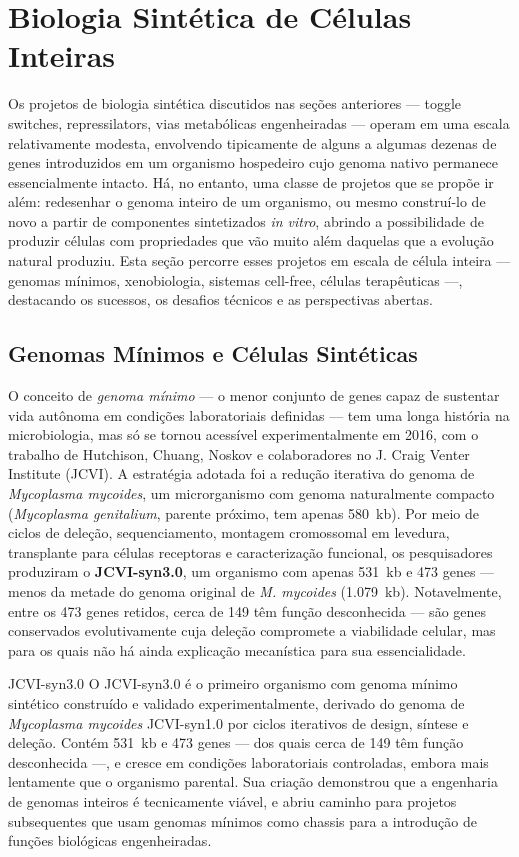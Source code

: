 \section{Biologia Sintética de Células Inteiras}
\label{sec:14-celulas}

Os projetos de biologia sintética discutidos nas seções anteriores --- toggle switches, repressilators, vias metabólicas engenheiradas --- operam em uma escala relativamente modesta, envolvendo tipicamente de alguns a algumas dezenas de genes introduzidos em um organismo hospedeiro cujo genoma nativo permanece essencialmente intacto. Há, no entanto, uma classe de projetos que se propõe ir além: redesenhar o genoma inteiro de um organismo, ou mesmo construí-lo de novo a partir de componentes sintetizados \emph{in vitro}, abrindo a possibilidade de produzir células com propriedades que vão muito além daquelas que a evolução natural produziu. Esta seção percorre esses projetos em escala de célula inteira --- genomas mínimos, xenobiologia, sistemas cell-free, células terapêuticas ---, destacando os sucessos, os desafios técnicos e as perspectivas abertas.

\subsection{Genomas Mínimos e Células Sintéticas}

O conceito de \emph{genoma mínimo} --- o menor conjunto de genes capaz de sustentar vida autônoma em condições laboratoriais definidas --- tem uma longa história na microbiologia, mas só se tornou acessível experimentalmente em 2016, com o trabalho de Hutchison, Chuang, Noskov e colaboradores no J. Craig Venter Institute (JCVI). A estratégia adotada foi a redução iterativa do genoma de \textit{Mycoplasma mycoides}, um microrganismo com genoma naturalmente compacto (\textit{Mycoplasma genitalium}, parente próximo, tem apenas 580~kb). Por meio de ciclos de deleção, sequenciamento, montagem cromossomal em levedura, transplante para células receptoras e caracterização funcional, os pesquisadores produziram o \textbf{JCVI-syn3.0}, um organismo com apenas 531~kb e 473 genes --- menos da metade do genoma original de \textit{M. mycoides} (1.079~kb). Notavelmente, entre os 473 genes retidos, cerca de 149 têm função desconhecida --- são genes conservados evolutivamente cuja deleção compromete a viabilidade celular, mas para os quais não há ainda explicação mecanística para sua essencialidade.

\begin{definicao}{JCVI-syn3.0}
O JCVI-syn3.0 é o primeiro organismo com genoma mínimo sintético construído e validado experimentalmente, derivado do genoma de \textit{Mycoplasma mycoides} JCVI-syn1.0 por ciclos iterativos de design, síntese e deleção. Contém 531~kb e 473 genes --- dos quais cerca de 149 têm função desconhecida ---, e cresce em condições laboratoriais controladas, embora mais lentamente que o organismo parental. Sua criação demonstrou que a engenharia de genomas inteiros é tecnicamente viável, e abriu caminho para projetos subsequentes que usam genomas mínimos como chassis para a introdução de funções biológicas engenheiradas.
\end{definicao}

